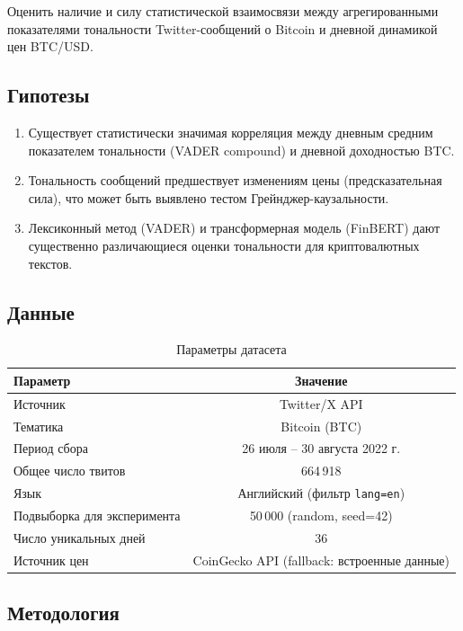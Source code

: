 \documentclass[a4paper,12pt]{article}
\begin{document}
Оценить наличие и силу статистической взаимосвязи между агрегированными показателями
тональности Twitter-сообщений о Bitcoin и дневной динамикой цен BTC/USD.

\subsection{Гипотезы}

\begin{enumerate}
  \item[$H_1$:] Существует статистически значимая корреляция между дневным средним
        показателем тональности (VADER compound) и дневной доходностью BTC.
  \item[$H_2$:] Тональность сообщений предшествует изменениям цены (предсказательная сила),
        что может быть выявлено тестом Грейнджер-каузальности.
  \item[$H_3$:] Лексиконный метод (VADER) и трансформерная модель (FinBERT)
        дают существенно различающиеся оценки тональности для криптовалютных текстов.
\end{enumerate}

\subsection{Данные}

\begin{table}[H]
\centering
\caption{Параметры датасета}
\label{tab:dataset}
\begin{tabular}{|l|c|}
\hline
\textbf{Параметр} & \textbf{Значение} \\
\hline
Источник & Twitter/X API \\
\hline
Тематика & Bitcoin (BTC) \\
\hline
Период сбора & 26 июля -- 30 августа 2022 г. \\
\hline
Общее число твитов & 664\,918 \\
\hline
Язык & Английский (фильтр \texttt{lang=en}) \\
\hline
Подвыборка для эксперимента & 50\,000 (random, seed=42) \\
\hline
Число уникальных дней & 36 \\
\hline
Источник цен & CoinGecko API (fallback: встроенные данные) \\
\hline
\end{tabular}
\end{table}

\subsection{Методология}
\end{document}
